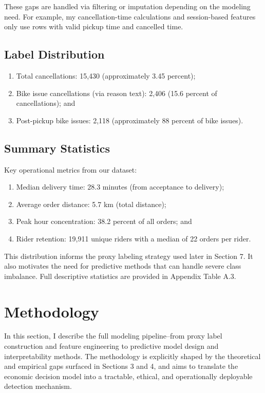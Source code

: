 \documentclass[12pt,letterpaper]{article}
\begin{document}
These gaps are handled via filtering or imputation depending on the modeling need. For example, my cancellation-time calculations and session-based features only use rows with valid pickup time and cancelled time.

\subsection{Label Distribution}
\begin{enumerate}
    \item Total cancellations: 15,430 (approximately 3.45 percent);
    \item Bike issue cancellations (via reason text): 2,406 (15.6 percent of cancellations); and
    \item Post-pickup bike issues: 2,118 (approximately 88 percent of bike issues).
\end{enumerate}

\subsection{Summary Statistics}

Key operational metrics from our dataset:
\begin{enumerate}
    \item Median delivery time: 28.3 minutes (from acceptance to delivery);
    \item Average order distance: 5.7 km (total distance);
    \item Peak hour concentration: 38.2 percent of all orders; and
    \item Rider retention: 19,911 unique riders with a median of 22 orders per rider.
\end{enumerate}

This distribution informs the proxy labeling strategy used later in Section 7. It also motivates the need for predictive methods that can handle severe class imbalance. Full descriptive statistics are provided in Appendix Table A.3.

\section{Methodology}

In this section, I describe the full modeling pipeline--from proxy label construction and feature engineering to predictive model design and interpretability methods. The methodology is explicitly shaped by the theoretical and empirical gaps surfaced in Sections 3 and 4, and aims to translate the economic decision model into a tractable, ethical, and operationally deployable detection mechanism.
\end{document}
